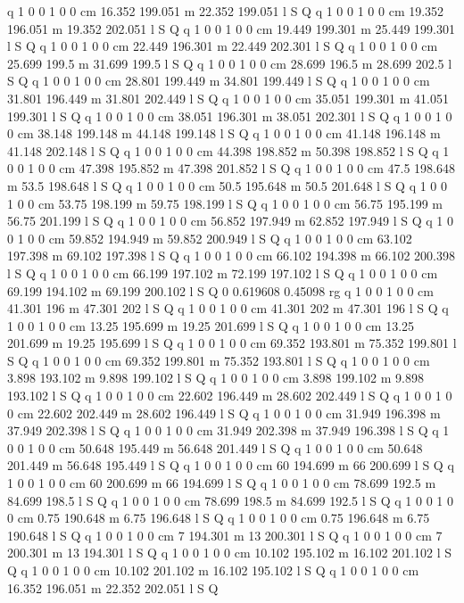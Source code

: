 q 1 0 0 1 0 0 cm
16.352 199.051 m 22.352 199.051 l S Q
q 1 0 0 1 0 0 cm
19.352 196.051 m 19.352 202.051 l S Q
q 1 0 0 1 0 0 cm
19.449 199.301 m 25.449 199.301 l S Q
q 1 0 0 1 0 0 cm
22.449 196.301 m 22.449 202.301 l S Q
q 1 0 0 1 0 0 cm
25.699 199.5 m 31.699 199.5 l S Q
q 1 0 0 1 0 0 cm
28.699 196.5 m 28.699 202.5 l S Q
q 1 0 0 1 0 0 cm
28.801 199.449 m 34.801 199.449 l S Q
q 1 0 0 1 0 0 cm
31.801 196.449 m 31.801 202.449 l S Q
q 1 0 0 1 0 0 cm
35.051 199.301 m 41.051 199.301 l S Q
q 1 0 0 1 0 0 cm
38.051 196.301 m 38.051 202.301 l S Q
q 1 0 0 1 0 0 cm
38.148 199.148 m 44.148 199.148 l S Q
q 1 0 0 1 0 0 cm
41.148 196.148 m 41.148 202.148 l S Q
q 1 0 0 1 0 0 cm
44.398 198.852 m 50.398 198.852 l S Q
q 1 0 0 1 0 0 cm
47.398 195.852 m 47.398 201.852 l S Q
q 1 0 0 1 0 0 cm
47.5 198.648 m 53.5 198.648 l S Q
q 1 0 0 1 0 0 cm
50.5 195.648 m 50.5 201.648 l S Q
q 1 0 0 1 0 0 cm
53.75 198.199 m 59.75 198.199 l S Q
q 1 0 0 1 0 0 cm
56.75 195.199 m 56.75 201.199 l S Q
q 1 0 0 1 0 0 cm
56.852 197.949 m 62.852 197.949 l S Q
q 1 0 0 1 0 0 cm
59.852 194.949 m 59.852 200.949 l S Q
q 1 0 0 1 0 0 cm
63.102 197.398 m 69.102 197.398 l S Q
q 1 0 0 1 0 0 cm
66.102 194.398 m 66.102 200.398 l S Q
q 1 0 0 1 0 0 cm
66.199 197.102 m 72.199 197.102 l S Q
q 1 0 0 1 0 0 cm
69.199 194.102 m 69.199 200.102 l S Q
0 0.619608 0.45098 rg
q 1 0 0 1 0 0 cm
41.301 196 m 47.301 202 l S Q
q 1 0 0 1 0 0 cm
41.301 202 m 47.301 196 l S Q
q 1 0 0 1 0 0 cm
13.25 195.699 m 19.25 201.699 l S Q
q 1 0 0 1 0 0 cm
13.25 201.699 m 19.25 195.699 l S Q
q 1 0 0 1 0 0 cm
69.352 193.801 m 75.352 199.801 l S Q
q 1 0 0 1 0 0 cm
69.352 199.801 m 75.352 193.801 l S Q
q 1 0 0 1 0 0 cm
3.898 193.102 m 9.898 199.102 l S Q
q 1 0 0 1 0 0 cm
3.898 199.102 m 9.898 193.102 l S Q
q 1 0 0 1 0 0 cm
22.602 196.449 m 28.602 202.449 l S Q
q 1 0 0 1 0 0 cm
22.602 202.449 m 28.602 196.449 l S Q
q 1 0 0 1 0 0 cm
31.949 196.398 m 37.949 202.398 l S Q
q 1 0 0 1 0 0 cm
31.949 202.398 m 37.949 196.398 l S Q
q 1 0 0 1 0 0 cm
50.648 195.449 m 56.648 201.449 l S Q
q 1 0 0 1 0 0 cm
50.648 201.449 m 56.648 195.449 l S Q
q 1 0 0 1 0 0 cm
60 194.699 m 66 200.699 l S Q
q 1 0 0 1 0 0 cm
60 200.699 m 66 194.699 l S Q
q 1 0 0 1 0 0 cm
78.699 192.5 m 84.699 198.5 l S Q
q 1 0 0 1 0 0 cm
78.699 198.5 m 84.699 192.5 l S Q
q 1 0 0 1 0 0 cm
0.75 190.648 m 6.75 196.648 l S Q
q 1 0 0 1 0 0 cm
0.75 196.648 m 6.75 190.648 l S Q
q 1 0 0 1 0 0 cm
7 194.301 m 13 200.301 l S Q
q 1 0 0 1 0 0 cm
7 200.301 m 13 194.301 l S Q
q 1 0 0 1 0 0 cm
10.102 195.102 m 16.102 201.102 l S Q
q 1 0 0 1 0 0 cm
10.102 201.102 m 16.102 195.102 l S Q
q 1 0 0 1 0 0 cm
16.352 196.051 m 22.352 202.051 l S Q
